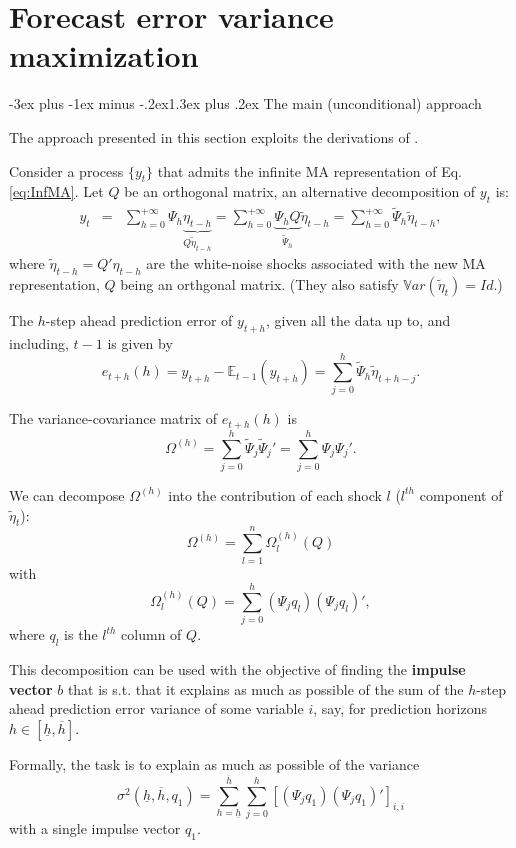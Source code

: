 \documentclass[
  11pt,
]{book}
\makeatletter
\renewcommand\section{\@startsection{section}{1}{\z@}
  {-3ex plus -1ex minus -.2ex}{1.3ex plus .2ex}
  {\normalfont\Large\bfseries\color{TextbookInk}}}
\theoremstyle{definition}
\theoremstyle{definition}
\theoremstyle{definition}
\theoremstyle{definition}
\theoremstyle{remark}
\makeatother
\begin{document}
\chapter{Forecast error variance maximization}\label{forecast-error-variance-maximization}

\section{The main (unconditional) approach}\label{the-main-unconditional-approach}

The approach presented in this section exploits the derivations of \citet{Uhlig_2004}.

Consider a process \(\{y_t\}\) that admits the infinite MA representation of Eq. \eqref{eq:InfMA}. Let \(Q\) be an orthogonal matrix, an alternative decomposition of \(y_t\) is:
\begin{eqnarray}
y_t&=&\sum_{h=0}^{+\infty}\Psi_h\underbrace{\eta_{t-h}}_{Q\tilde \eta_{t-h}} = \sum_{h=0}^{+\infty}\underbrace{\Psi_hQ}_{\tilde\Psi_h}\tilde
\eta_{t-h} = \sum_{h=0}^{+\infty}\tilde\Psi_h\tilde \eta_{t-h},
\end{eqnarray}
where \(\tilde \eta_{t-h}=Q'\eta_{t-h}\) are the white-noise shocks associated with the new MA representation, \(Q\) being an orthgonal matrix. (They also satisfy \(\mathbb{V}ar(\tilde\eta_t)=Id\).)

The \(h\)-step ahead prediction error of \(y_{t+h}\), given all the data up to, and including, \(t-1\) is given by
\[
e_{t+h}(h)=y_{t+h}-\mathbb{E}_{t-1}(y_{t+h})=\sum_{j=0}^h\tilde \Psi_h\tilde \eta_{t+h-j}.
\]

The variance-covariance matrix of \(e_{t+h}(h)\) is
\[
\Omega^{(h)}=\sum_{j=0}^h\tilde \Psi_j\tilde \Psi_j'=\sum_{j=0}^h \Psi_j \Psi_j'.
\]

We can decompose \(\Omega^{(h)}\) into the contribution of each shock \(l\) (\(l^{th}\) component of \(\tilde{\eta}_t\)):
\[
\Omega^{(h)}=\sum_{l=1}^n\Omega_l^{(h)}(Q)
\]
with
\[
\Omega_l^{(h)}(Q) =\sum_{j=0}^h(\Psi_jq_l)(\Psi_jq_l)',
\]
where \(q_l\) is the \(l^{th}\) column of \(Q\).

This decomposition can be used with the objective of finding the \textbf{impulse vector} \(b\) that is s.t. that it explains as much as possible of the sum of the \(h\)-step ahead prediction error variance of some variable \(i\), say, for prediction horizons \(h \in [\underline{h} , \overline{h}]\).

Formally, the task is to explain as much as possible of the variance
\[
\sigma^2(\underline{h},\overline{h},q_1)=\sum_{h=\underline{h}}^{\overline{h}} \sum_{j=0}^h\left[(\Psi_jq_1)(\Psi_jq_1)'\right]_{i,i}
\]
with a single impulse vector \(q_1\).
\end{document}
